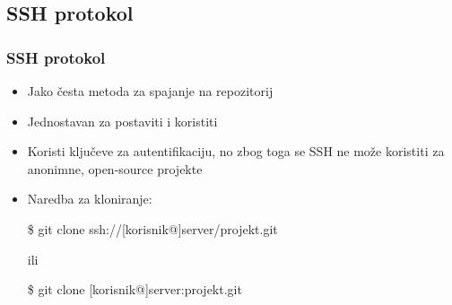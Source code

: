 \subsection{SSH protokol}

\begin{frame}
\frametitle{SSH protokol}
\begin{itemize}
	\item Jako česta metoda za spajanje na repozitorij
	\item Jednostavan za postaviti i koristiti
	\item Koristi ključeve za autentifikaciju, no zbog toga se SSH ne može koristiti za anonimne, open-source projekte
	\item Naredba za kloniranje:

	\$ git clone ssh://[korisnik@]server/projekt.git

	ili

	\$ git clone [korisnik@]server:projekt.git
\end{itemize}
\end{frame}